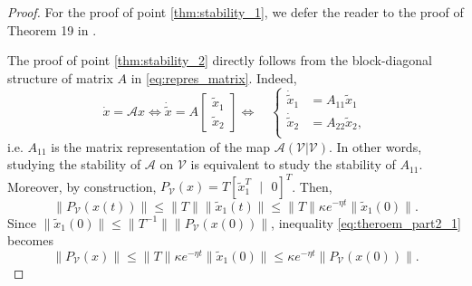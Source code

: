 \documentclass[a4paper]{article}
\theoremstyle{plain}
\begin{document}
\begin{proof}
	For the proof of point \ref{thm:stability_1}, we defer the reader to the proof of Theorem 19 in \cite{callier2012linear}.
	
	The proof of point \ref{thm:stability_2} directly follows from the block-diagonal structure of matrix $A$ in \eqref{eq:repres_matrix}. Indeed,
	\begin{equation*}
	\dot{x} = \mathcal{A} x \Leftrightarrow \dot{\tilde x} =A \left[ \begin{array}{c}
	\tilde{x}_1 \\
	\hline
	\tilde{x}_2
	\end{array}\right]\Leftrightarrow
	\quad\left\lbrace \begin{aligned}
	\dot{\tilde{x}}_1  &= A_{11}\tilde{x}_1\\
	\dot{\tilde{x}}_2 &= A_{22}\tilde{x}_2,\\  
	\end{aligned}
	\right.
	\end{equation*}
	i.e. $A_{11}$ is the matrix representation of the map $\mathcal{A}(\mathcal{V}|\mathcal{V})$. In other words, studying the stability of $\mathcal{A}$ on $\mathcal{V}$ is equivalent to study the stability of $A_{11}$. 
	Moreover, by construction, $P_{\mathcal{V}}(x) = T[\tilde{x}_1^T \text{ } |	\text{ } 0]^T$. Then,
	\begin{equation}
	\label{eq:theroem_part2_1}
	\lVert P_{\mathcal{V}}(x(t))\rVert\leq \lVert T \rVert \lVert\tilde{x}_1(t) \rVert\leq \lVert T \rVert\kappa e^{-\eta t}\lVert\tilde{x}_1(0) \rVert.
	\end{equation}
	Since $\lVert\tilde{x}_1(0) \rVert \leq \lVert T^{-1}\rVert \lVert P_{\mathcal{V}}(x(0)) \rVert$, inequality \eqref{eq:theroem_part2_1} becomes
	\begin{equation*}
	\label{eq:theroem_part2_2}
	\lVert P_{\mathcal{V}}(x) \rVert\leq \lVert T \rVert\kappa e^{-\eta t}\lVert\tilde{x}_1(0) \rVert\leq \kappa e^{-\eta t}\lVert P_{\mathcal{V}}(x(0)) \rVert.
	\end{equation*}
\end{proof}
\end{document}
